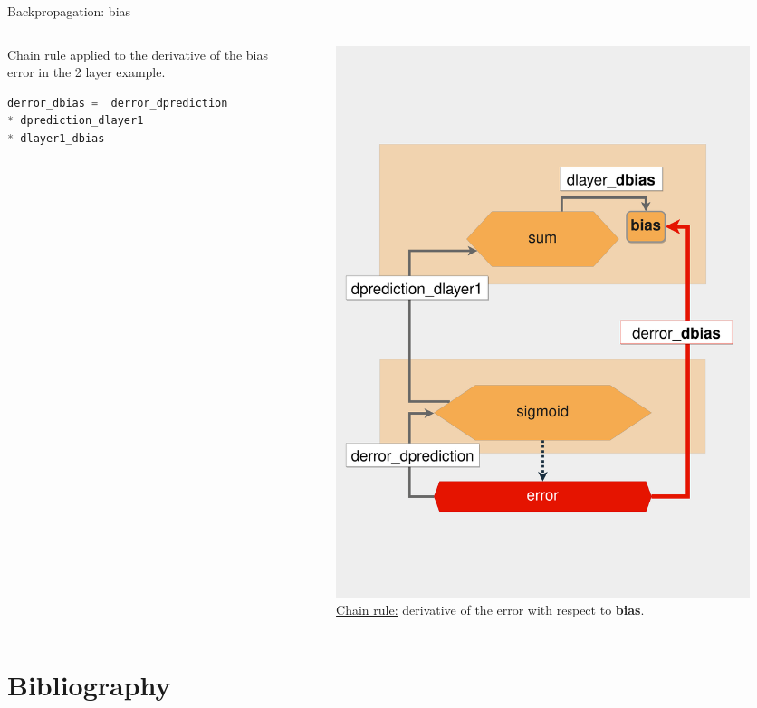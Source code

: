 \documentclass{beamer}
\begin{document}
\begin{frame}[fragile]{Backpropagation: bias}
    \begin{columns}
        \begin{column}{0.6\linewidth}  
            Chain rule applied to the derivative of the bias error in the 2 layer example.   
            \begin{lstlisting}[language=Python]
derror_dbias =  derror_dprediction 
* dprediction_dlayer1 
* dlayer1_dbias
            \end{lstlisting}
        \end{column}
        \begin{column}{0.4\linewidth}
            \begin{figure}
                \includegraphics[width=0.9\linewidth]{BiasGradient}
                \caption{\href{https://realpython.com/python-ai-neural-network/}{Chain rule:}  derivative of the error with respect to {\bf bias}.}
                \label{Fig:Training2Layer}
            \end{figure}
        \end{column}
     \end{columns}
\end{frame}



\section{Bibliography}


\end{document}
